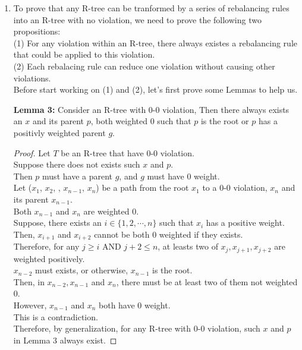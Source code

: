 \documentclass[10pt]{article}
\newcommand{\aand}{\mbox{ AND }}
\begin{document}
\begin{enumerate}
\begin{proof}
\begin{addmargin}[1em]{0em}

        \begin{addmargin}[1em]{0em}
		\end{addmargin}

	\end{addmargin}
	
	\end{proof}

	\item
	To prove that any R-tree can be tranformed by a series of rebalancing rules into an R-tree with no violation, we need to prove the following two propositions: \\
	(1) For any violation within an R-tree, there always existes a rebalancing rule that could be applied to this violation. \\
	(2) Each rebalacing rule can reduce one violation without causing other violations. \\

	Before start working on (1) and (2), let's first prove some Lemmas to help us. 

	\textbf{Lemma 3:} Consider an R-tree with 0-0 violation, Then there always exists an $x$ and its parent $p$, both weighted 0 such that $p$ is the root or $p$ has a positivly weighted parent $g$. \\
	\begin{proof}
	Let $T$ be an R-tree that have 0-0 violation. \\
	Suppose there does not exists such $x$ and $p$. \\
	Then $p$ must have a parent $g$, and $g$ must have 0 weight. \\
	Let ($x_1$, $x_2$, \cdots, $x_{n-1}$, $x_{n}$) be a path from the root $x_1$ to a 0-0 violation, $x_{n}$ and its parent $x_{n-1}$. \\
	Both $x_{n-1}$ and $x_{n}$ are weighted 0. \\
	Suppose, there exists an $i \in \{1, 2, \cdots, n\}$ such that $x_{i}$ has a positive  weight. \\
	Then, $x_{i+1}$ and $x_{i+2}$ cannot be both 0 weighted if they exists. \\
	Therefore, for any $j \geq i \aand j+2 \leq n$, at leasts two of $x_{j}, x_{j+1}, x_{j+2}$ are weighted positively. \\
	$x_{n-2}$ must exists, or otherwise, $x_{n-1}$ is the root. \\
	Then, in $x_{n-2}, x_{n-1}$ and $x_{n}$, there must be at least two of them not weighted 0. \\
	However, $x_{n-1}$ and $x_{n}$ both have 0 weight. \\
	This is a contradiction. \\
	Therefore, by generalization, for any R-tree with 0-0 violation, such $x$ and $p$ in Lemma 3 always exist. 
	\end{proof}


\end{enumerate}
\end{document}
